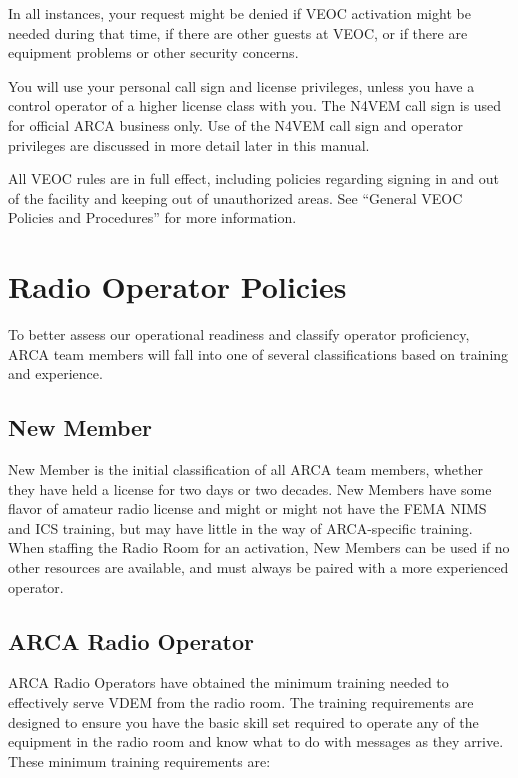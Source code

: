 \documentclass[pdflatex,letterpaper,twoside,12pt]{book}
\begin{document}
In all instances, your request might be denied if VEOC activation might be needed during that time, if there are other guests at VEOC, or if there are equipment problems or other security concerns.

You will use your personal call sign and license privileges, unless you have a control operator of a higher license class with you.  The N4VEM call sign is used for official ARCA business only.  Use of the N4VEM call sign and operator privileges are discussed in more detail later in this manual.

All VEOC rules are in full effect, including policies regarding signing in and out of the facility and keeping out of unauthorized areas.  See ``General VEOC Policies and Procedures'' for more information.


\section{Radio Operator Policies}

To better assess our operational readiness and classify operator proficiency, ARCA team members will fall into one of several classifications based on training and experience.

\subsection{New Member}

New Member is the initial classification of all ARCA team members, whether they have held a license for two days or two decades.  New Members have some flavor of amateur radio license and might or might not have the FEMA NIMS and ICS training, but may have little in the way of ARCA-specific training.  When staffing the Radio Room for an activation, New Members can be used if no other resources are available, and must always be paired with a more experienced operator.

\subsection{ARCA Radio Operator}

ARCA Radio Operators have obtained the minimum training needed to effectively serve VDEM from the radio room.  The training requirements are designed to ensure you have the basic skill set required to operate any of the equipment in the radio room and know what to do with messages as they arrive.  These minimum training requirements are:
\end{document}
